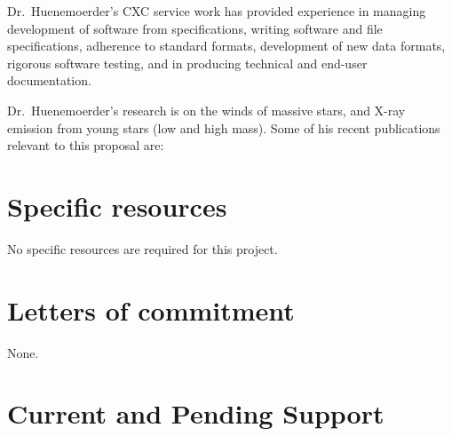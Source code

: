 \documentclass[fleqn,12pt,onecolumn]{SelfArx} %
\begin{document}
Dr.\ Huenemoerder's CXC service work has provided experience in
managing development of software from specifications, writing software
and file specifications, adherence to standard formats, development of
new data formats, rigorous software testing, and in producing
technical and end-user documentation.

Dr.\ Huenemoerder's research is on the winds of massive
stars, and X-ray emission from young stars (low and high mass).  Some
of his recent publications relevant to this proposal are:



\section{Specific resources}
No specific resources are required for this project.

\section{Letters of commitment}
None.


\section{Current and Pending Support}




%
%

\end{document}
